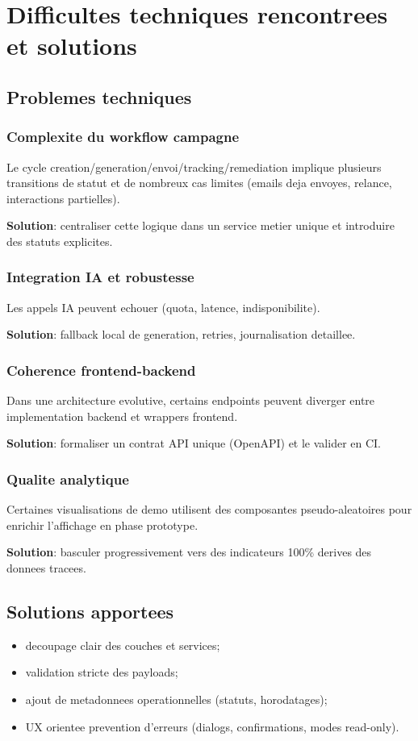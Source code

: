 \documentclass[12pt,a4paper,oneside]{report}
\begin{document}
\chapter{Difficultes techniques rencontrees et solutions}

\section{Problemes techniques}
\subsection{Complexite du workflow campagne}
Le cycle creation/generation/envoi/tracking/remediation implique plusieurs transitions de statut et de nombreux cas limites (emails deja envoyes, relance, interactions partielles).

\textbf{Solution}: centraliser cette logique dans un service metier unique et introduire des statuts explicites.

\subsection{Integration IA et robustesse}
Les appels IA peuvent echouer (quota, latence, indisponibilite).

\textbf{Solution}: fallback local de generation, retries, journalisation detaillee.

\subsection{Coherence frontend-backend}
Dans une architecture evolutive, certains endpoints peuvent diverger entre implementation backend et wrappers frontend.

\textbf{Solution}: formaliser un contrat API unique (OpenAPI) et le valider en CI.

\subsection{Qualite analytique}
Certaines visualisations de demo utilisent des composantes pseudo-aleatoires pour enrichir l'affichage en phase prototype.

\textbf{Solution}: basculer progressivement vers des indicateurs 100\% derives des donnees tracees.

\section{Solutions apportees}
\begin{itemize}[leftmargin=1.2cm]
  \item decoupage clair des couches et services;
  \item validation stricte des payloads;
  \item ajout de metadonnees operationnelles (statuts, horodatages);
  \item UX orientee prevention d'erreurs (dialogs, confirmations, modes read-only).
\end{itemize}
\end{document}
